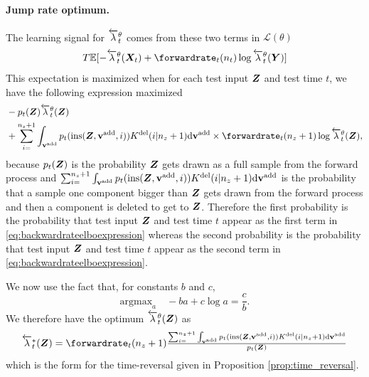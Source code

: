 \paragraph{Jump rate optimum.} The learning signal for $\overleftarrow{\lambda}_{t}^\theta$ comes from these two terms in $\mathcal{L}(\theta)$
\begin{equation}
    T \mathbb{E}[ - \backwardrate_t^\theta(\mX_t) + \forwardrate_t(n_t) \log \backwardrate_t^\theta(\mY) ]
    \label{eq:backwardrateelboexpression}
\end{equation}
This expectation is maximized when for each test input ${\bm{Z}}$ and test time $t$, we have the following expression maximized
\begin{align}
  \textstyle 
    &-p_t(\mZ) \backwardrate_t^\theta(\mZ) \\
    &+ \sum_{i=}^{n_z+1} \int_{\yadd} p_t(\text{ins}(\mZ, \yadd, i)) \delidxdist(i | n_z + 1) \rmd \yadd \times \forwardrate_t(n_z + 1) \log \backwardrate_t^\theta(\mZ) , \nonumber 
\end{align}
because $p_t({\bm{Z}})$ is the probability ${\bm{Z}}$ gets drawn as a full sample from the forward process and $\sum_{i=}^{n_z+1} \int_{{\mathbf{v}}^{\textup{add}}} p_t(\text{ins}({\bm{Z}}, {\mathbf{v}}^{\textup{add}}, i)) K^{\textup{del}}(i | n_z + 1) \mathrm{d} {\mathbf{v}}^{\textup{add}} $ is the probability that a sample one component bigger than ${\bm{Z}}$ gets drawn from the forward process and then a component is deleted to get to ${\bm{Z}}$. Therefore the first probability is the probability that test input ${\bm{Z}}$ and test time $t$ appear as the first term in \eqref{eq:backwardrateelboexpression} whereas the second probability is the probability that test input ${\bm{Z}}$ and test time $t$ appear as the second term in \eqref{eq:backwardrateelboexpression}.

We now use the fact that, for constants $b$ and $c$,
\begin{equation}
    \textstyle \mathrm{argmax}_a \quad -ba + c \log a = \frac{c}{b}.
    \label{eq:log_minimizer}
\end{equation}
We therefore have the optimum $\overleftarrow{\lambda}_t^\theta({\bm{Z}})$ as
\begin{equation}
\textstyle    \backwardrate_t^*(\mZ) = \forwardrate_t(n_z + 1) \frac{\sum_{i=}^{n_z+1} \int_{\yadd} p_t(\text{ins}(\mZ, \yadd, i)) \delidxdist(i | n_z + 1) \rmd \yadd}{ p_t(\mZ) }
\end{equation}
which is the form for the time-reversal given in Proposition \eqref{prop:time_reversal}.\\

